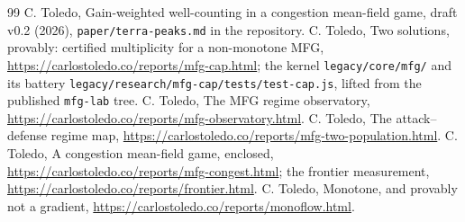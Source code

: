 \documentclass[11pt]{article}
\theoremstyle{definition}
\begin{document}
\begin{thebibliography}{99}
 C. Toledo, Gain-weighted well-counting in a congestion mean-field game, draft v0.2 (2026), \texttt{paper/terra-peaks.md} in the repository.
 C. Toledo, Two solutions, provably: certified multiplicity for a non-monotone MFG, \url{https://carlostoledo.co/reports/mfg-cap.html}; the kernel \texttt{legacy/core/mfg/} and its battery \texttt{legacy/research/mfg-cap/tests/test-cap.js}, lifted from the published \texttt{mfg-lab} tree.
 C. Toledo, The MFG regime observatory, \url{https://carlostoledo.co/reports/mfg-observatory.html}.
 C. Toledo, The attack--defense regime map, \url{https://carlostoledo.co/reports/mfg-two-population.html}.
 C. Toledo, A congestion mean-field game, enclosed, \url{https://carlostoledo.co/reports/mfg-congest.html}; the frontier measurement, \url{https://carlostoledo.co/reports/frontier.html}.
 C. Toledo, Monotone, and provably not a gradient, \url{https://carlostoledo.co/reports/monoflow.html}.
\end{thebibliography}
\end{document}
